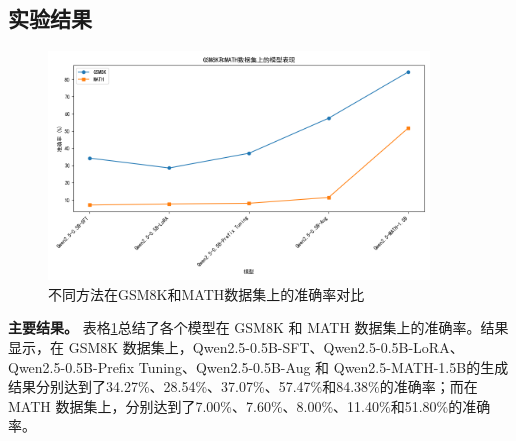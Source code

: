 \subsection{实验结果} 

\begin{figure}[htbp]
    \centering
    \includegraphics[width=0.9\textwidth]{figs/model_acc.png} 
    \caption{不同方法在GSM8K和MATH数据集上的准确率对比}
    \label{fig:experiment_result}
\end{figure}

\textbf{主要结果。} 
 表格\ref{fig:experiment_result}总结了各个模型在 GSM8K 和 MATH 数据集上的准确率。结果显示，在 GSM8K 数据集上，Qwen2.5-0.5B-SFT、Qwen2.5-0.5B-LoRA、Qwen2.5-0.5B-Prefix Tuning、Qwen2.5-0.5B-Aug 和 Qwen2.5-MATH-1.5B的生成结果分别达到了34.27\%、28.54\%、37.07\%、57.47\%和84.38\%的准确率；而在 MATH 数据集上，分别达到了7.00\%、7.60\%、8.00\%、11.40\%和51.80\%的准确率。

